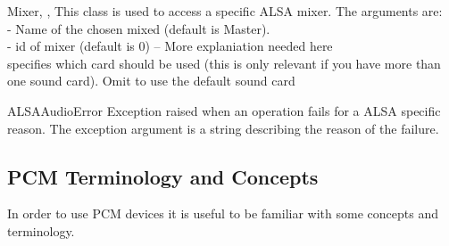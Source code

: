 \begin{classdesc}{Mixer}{, , }
This class is used to access a specific ALSA mixer.
The arguments are: \\
 - Name of the chosen mixed (default is Master). \\
 - id of mixer (default is 0) -- More explaniation needed here\\
 specifies which card should be used (this is only relevant 
if you have more than one sound card). Omit to use the default sound card
\end{classdesc}


\begin{excdesc}{ALSAAudioError}
  Exception raised when an operation fails for a ALSA specific reason.
  The exception argument is a string describing the reason of the
  failure.
\end{excdesc}

\subsection{PCM Terminology and Concepts}

In order to use PCM devices it is useful to be familiar with some concepts and
terminology.

